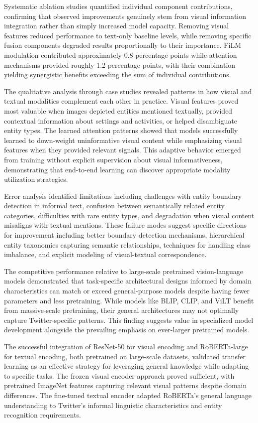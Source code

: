 \documentclass[12pt,a4paper]{report}
\begin{document}
Systematic ablation studies quantified individual component contributions, confirming that observed improvements genuinely stem from visual information integration rather than simply increased model capacity. Removing visual features reduced performance to text-only baseline levels, while removing specific fusion components degraded results proportionally to their importance. FiLM modulation contributed approximately 0.8 percentage points while attention mechanisms provided roughly 1.2 percentage points, with their combination yielding synergistic benefits exceeding the sum of individual contributions.

The qualitative analysis through case studies revealed patterns in how visual and textual modalities complement each other in practice. Visual features proved most valuable when images depicted entities mentioned textually, provided contextual information about settings and activities, or helped disambiguate entity types. The learned attention patterns showed that models successfully learned to down-weight uninformative visual content while emphasizing visual features when they provided relevant signals. This adaptive behavior emerged from training without explicit supervision about visual informativeness, demonstrating that end-to-end learning can discover appropriate modality utilization strategies.

Error analysis identified limitations including challenges with entity boundary detection in informal text, confusion between semantically related entity categories, difficulties with rare entity types, and degradation when visual content misaligns with textual mentions. These failure modes suggest specific directions for improvement including better boundary detection mechanisms, hierarchical entity taxonomies capturing semantic relationships, techniques for handling class imbalance, and explicit modeling of visual-textual correspondence.

The competitive performance relative to large-scale pretrained vision-language models demonstrated that task-specific architectural designs informed by domain characteristics can match or exceed general-purpose models despite having fewer parameters and less pretraining. While models like BLIP, CLIP, and ViLT benefit from massive-scale pretraining, their general architectures may not optimally capture Twitter-specific patterns. This finding suggests value in specialized model development alongside the prevailing emphasis on ever-larger pretrained models.

The successful integration of ResNet-50 for visual encoding and RoBERTa-large for textual encoding, both pretrained on large-scale datasets, validated transfer learning as an effective strategy for leveraging general knowledge while adapting to specific tasks. The frozen visual encoder approach proved sufficient, with pretrained ImageNet features capturing relevant visual patterns despite domain differences. The fine-tuned textual encoder adapted RoBERTa's general language understanding to Twitter's informal linguistic characteristics and entity recognition requirements.
\end{document}
